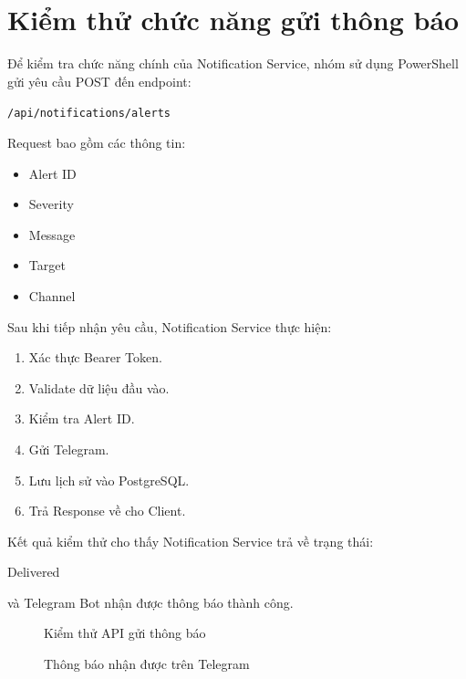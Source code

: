 \section{Kiểm thử chức năng gửi thông báo}

Để kiểm tra chức năng chính của Notification Service, nhóm sử dụng PowerShell gửi yêu cầu POST đến endpoint:

\begin{center}
\texttt{/api/notifications/alerts}
\end{center}

Request bao gồm các thông tin:

\begin{itemize}
\item Alert ID
\item Severity
\item Message
\item Target
\item Channel
\end{itemize}

Sau khi tiếp nhận yêu cầu, Notification Service thực hiện:

\begin{enumerate}
\item Xác thực Bearer Token.
\item Validate dữ liệu đầu vào.
\item Kiểm tra Alert ID.
\item Gửi Telegram.
\item Lưu lịch sử vào PostgreSQL.
\item Trả Response về cho Client.
\end{enumerate}

Kết quả kiểm thử cho thấy Notification Service trả về trạng thái:

\begin{center}
Delivered
\end{center}

và Telegram Bot nhận được thông báo thành công.

\begin{figure}[H]
\centering
{}
\caption{Kiểm thử API gửi thông báo}
\label{fig:post-alert}
\end{figure}

\begin{figure}[H]
\centering
{}
\caption{Thông báo nhận được trên Telegram}
\label{fig:telegram}
\end{figure}

